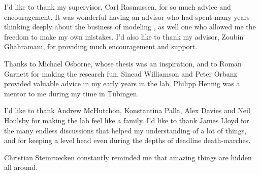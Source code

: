 
\begin{acknowledgements}      


I'd like to thank my supervisor, Carl Rasmussen, for so much advice and encouragement.
It was wonderful having an advisor who had spent many years thinking deeply about the business of modeling
, as well one who allowed me the freedom to make my own mistakes.
I'd also like to thank my advisor, Zoubin Ghahramani, for providing much encouragement and support.

Thanks to Michael Osborne, whose thesis was an inspiration, and to Roman Garnett for making the research fun.
Sinead Williamson and Peter Orbanz provided valuable advice in my early years in the lab.
Philipp Hennig was a mentor to me during my time in T\"{u}bingen.

I'd like to thank Andrew McHutchon, Konstantina Palla, Alex Davies and Neil Houlsby for making the lab feel like a family.
I'd like to thank James Lloyd for the many endless discussions that helped my understanding of a lot of things, and for keeping a level head even during the depths of deadline death-marches.

Christian Steinruecken constantly reminded me that amazing things are hidden all around.

\end{acknowledgements}
